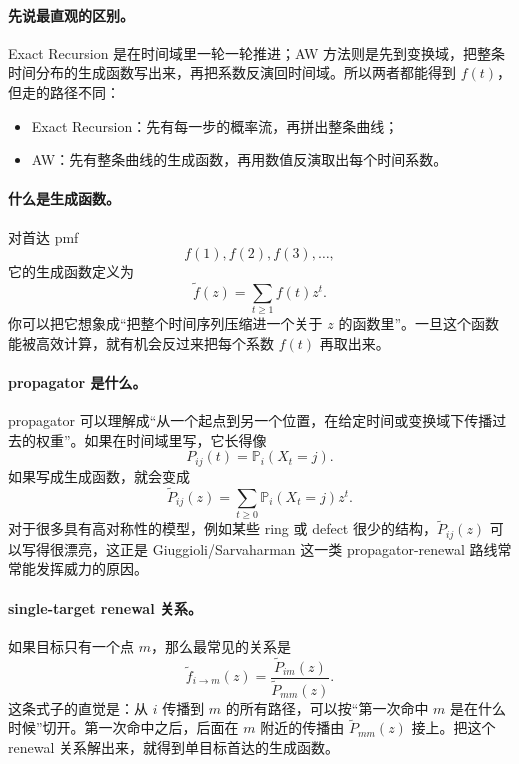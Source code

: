 \documentclass[11pt,fontset=fandol]{ctexart}
\begin{document}
\paragraph{先说最直观的区别。}
Exact Recursion 是在时间域里一轮一轮推进；AW 方法则是先到变换域，把整条时间分布的生成函数写出来，再把系数反演回时间域。所以两者都能得到 $f(t)$，但走的路径不同：
\begin{itemize}
  \item Exact Recursion：先有每一步的概率流，再拼出整条曲线；
  \item AW：先有整条曲线的生成函数，再用数值反演取出每个时间系数。
\end{itemize}

\paragraph{什么是生成函数。}
对首达 pmf
\[
  f(1),f(2),f(3),\dots,
\]
它的生成函数定义为
\begin{equation}
  \widetilde f(z)=\sum_{t\ge 1} f(t)z^t.
  \label{eq:genfun-def}
\end{equation}
你可以把它想象成“把整个时间序列压缩进一个关于 $z$ 的函数里”。一旦这个函数能被高效计算，就有机会反过来把每个系数 $f(t)$ 再取出来。

\paragraph{propagator 是什么。}
propagator 可以理解成“从一个起点到另一个位置，在给定时间或变换域下传播过去的权重”。如果在时间域里写，它长得像
\[
  P_{ij}(t)=\mathbb P_i(X_t=j).
\]
如果写成生成函数，就会变成
\[
  \widetilde P_{ij}(z)=\sum_{t\ge 0}\mathbb P_i(X_t=j)z^t.
\]
对于很多具有高对称性的模型，例如某些 ring 或 defect 很少的结构，$\widetilde P_{ij}(z)$ 可以写得很漂亮，这正是 Giuggioli/Sarvaharman 这一类 propagator-renewal 路线常常能发挥威力的原因。

\paragraph{single-target renewal 关系。}
如果目标只有一个点 $m$，那么最常见的关系是
\begin{equation}
  \widetilde f_{i\to m}(z)=\frac{\widetilde P_{im}(z)}{\widetilde P_{mm}(z)}.
  \label{eq:renewal-single}
\end{equation}
这条式子的直觉是：从 $i$ 传播到 $m$ 的所有路径，可以按“第一次命中 $m$ 是在什么时候”切开。第一次命中之后，后面在 $m$ 附近的传播由 $\widetilde P_{mm}(z)$ 接上。把这个 renewal 关系解出来，就得到单目标首达的生成函数。
\end{document}
